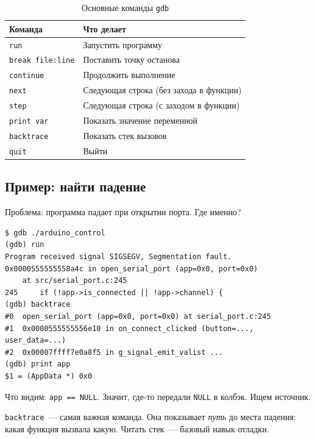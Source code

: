 \begin{table}[htbp]
\centering
\caption{Основные команды \texttt{gdb}}
\label{tab:gdb-commands}
\small
\begin{tabularx}{\textwidth}{@{}l L@{}}
\toprule
\textbf{Команда} & \textbf{Что делает} \\
\midrule
\texttt{run}             & Запустить программу \\
\texttt{break file:line} & Поставить точку останова \\
\texttt{continue}        & Продолжить выполнение \\
\texttt{next}            & Следующая строка (без захода в функции) \\
\texttt{step}            & Следующая строка (с заходом в функции) \\
\texttt{print var}       & Показать значение переменной \\
\texttt{backtrace}       & Показать стек вызовов \\
\texttt{quit}            & Выйти \\
\bottomrule
\end{tabularx}
\end{table}

\subsection{Пример: найти падение}

Проблема: программа падает при открытии
порта. Где именно?

\begin{verbatim}
$ gdb ./arduino_control
(gdb) run
Program received signal SIGSEGV, Segmentation fault.
0x0000555555558a4c in open_serial_port (app=0x0, port=0x0)
    at src/serial_port.c:245
245     if (!app->is_connected || !app->channel) {
(gdb) backtrace
#0  open_serial_port (app=0x0, port=0x0) at serial_port.c:245
#1  0x0000555555556e10 in on_connect_clicked (button=..., user_data=...)
#2  0x00007ffff7e0a8f5 in g_signal_emit_valist ...
(gdb) print app
$1 = (AppData *) 0x0
\end{verbatim}

Что видим: \texttt{app == NULL}. Значит,
где-то передали \texttt{NULL} в колбэк.
Ищем источник.

\begin{keybox}
\texttt{backtrace}~--- самая важная команда. Она
показывает \emph{путь} до места падения:
какая функция вызвала какую. Читать
стек~--- базовый навык отладки.
\end{keybox}

